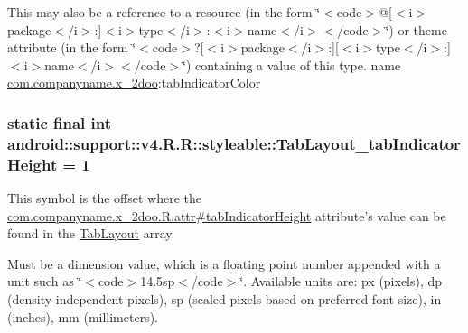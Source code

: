 This may also be a reference to a resource (in the form \char`\"{}$<$code$>$@\mbox{[}$<$i$>$package$<$/i$>$:\mbox{]}$<$i$>$type$<$/i$>$:$<$i$>$name$<$/i$>$$<$/code$>$\char`\"{}) or theme attribute (in the form \char`\"{}$<$code$>$?\mbox{[}$<$i$>$package$<$/i$>$:\mbox{]}\mbox{[}$<$i$>$type$<$/i$>$:\mbox{]}$<$i$>$name$<$/i$>$$<$/code$>$\char`\"{}) containing a value of this type.  name \hyperlink{namespacecom_1_1companyname_1_1x__2doo}{com.companyname.x\_\-2doo}:tabIndicatorColor \hypertarget{classandroid_1_1support_1_1v4_1_1_r_1_1styleable_be8e5fea2ebe1b6d9d9aa4cca6549e78}{
\subsubsection[{TabLayout\_\-tabIndicatorHeight}]{\setlength{\rightskip}{0pt plus 5cm}static final int android::support::v4.R.R::styleable::TabLayout\_\-tabIndicatorHeight = 1}}
\label{classandroid_1_1support_1_1v4_1_1_r_1_1styleable_be8e5fea2ebe1b6d9d9aa4cca6549e78}


This symbol is the offset where the \hyperlink{classcom_1_1companyname_1_1x__2doo_1_1_r_1_1attr_85ace4563535abbe26f887e8ce5ab7f5}{com.companyname.x\_\-2doo.R.attr\#tabIndicatorHeight} attribute's value can be found in the \hyperlink{classandroid_1_1support_1_1v4_1_1_r_1_1styleable_d1f1104cdc4fac0ab4797d48f7efe351}{TabLayout} array.

Must be a dimension value, which is a floating point number appended with a unit such as \char`\"{}$<$code$>$14.5sp$<$/code$>$\char`\"{}. Available units are: px (pixels), dp (density-independent pixels), sp (scaled pixels based on preferred font size), in (inches), mm (millimeters). 

